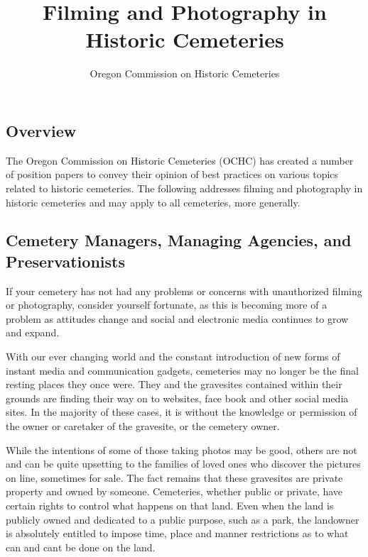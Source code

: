 \documentclass[]{article}
\title{Filming and Photography in Historic Cemeteries}
\author{Oregon Commission on Historic Cemeteries}
\date{}
\begin{document}
\maketitle


{
\hypersetup{linkcolor=black}
\setcounter{tocdepth}{4}
\tableofcontents
}
\subsection{Overview}\label{overview}

The Oregon Commission on Historic Cemeteries (OCHC) has created a number
of position papers to convey their opinion of best practices on various
topics related to historic cemeteries. The following addresses filming
and photography in historic cemeteries and may apply to all cemeteries,
more generally.

\subsection{Cemetery Managers, Managing Agencies, and
Preservationists}\label{cemetery-managers-managing-agencies-and-preservationists}

If your cemetery has not had any problems or concerns with unauthorized
filming or photography, consider yourself fortunate, as this is becoming
more of a problem as attitudes change and social and electronic media
continues to grow and expand.

With our ever changing world and the constant introduction of new forms
of instant media and communication gadgets, cemeteries may no longer be
the final resting places they once were. They and the gravesites
contained within their grounds are finding their way on to websites,
face book and other social media sites. In the majority of these cases,
it is without the knowledge or permission of the owner or caretaker of
the gravesite, or the cemetery owner.

While the intentions of some of those taking photos may be good, others
are not and can be quite upsetting to the families of loved ones who
discover the pictures on line, sometimes for sale. The fact remains that
these gravesites are private property and owned by someone. Cemeteries,
whether public or private, have certain rights to control what happens
on that land. Even when the land is publicly owned and dedicated to a
public purpose, such as a park, the landowner is absolutely entitled to
impose time, place and manner restrictions as to what can and cant be
done on the land.
\end{document}
